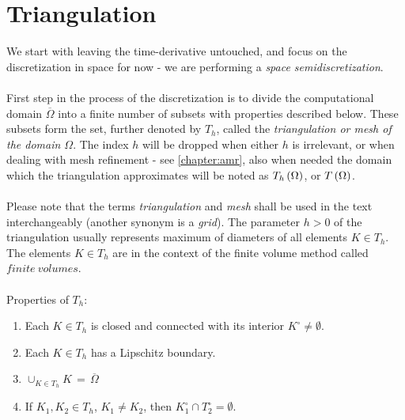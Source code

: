 \section{Triangulation}
\label{section:triangulation}
We start with leaving the time-derivative untouched, and focus on the discretization in space for now - we are performing a \textit{space semidiscretization}.
\paragraph{}
First step in the process of the discretization is to divide the computational domain $\overline{\Omega}$ into a finite number of subsets with properties described below. These subsets form the set, further denoted by $T_h$, called the \textit{triangulation or mesh of the domain $\Omega$}. The index $h$ will be dropped when either $h$ is irrelevant, or when dealing with mesh refinement - see \cref{chapter:amr}, also when needed the domain which the triangulation approximates will be noted as $T_h\left(\Omega\right)$, or $T\left(\Omega\right)$.
\paragraph{}
Please note that the terms \textit{triangulation} and \textit{mesh} shall be used in the text interchangeably (another synonym is a \textit{grid}). The parameter $h>0$ of the triangulation usually represents maximum of diameters of all elements $K\in T_h$. The elements $K\in T_h$ are in the context of the finite volume method called $finite\ volumes$.
\\\ \\Properties of $T_h$:
\begin{enumerate}
    \item Each $K\in T_h$ is closed and connected with its interior $K^{\circ}\neq\emptyset$.
    \item Each $K\in T_h$ has a Lipschitz boundary.
    \item$\cup_{K\in T_h}K\,=\,\overline{\Omega}$
    \item If $K_1,K_2\in T_h$, $K_1\neq{K_2}$, then $K_1^{\circ}\cap{T}_2^{\circ} = \emptyset$.
\end{enumerate}
